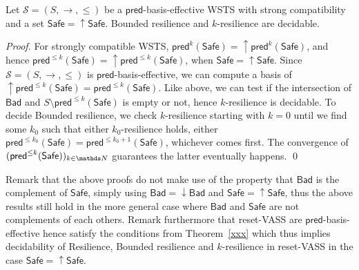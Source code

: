 \documentclass[runningheads]{llncs}
\newcommand{\pred}{\textsf{pred}}
\newcommand{\post}{\textsf{post}}
\newcommand{\Bad}{\textsf{Bad}}
\newcommand{\Safe}{\textsf{Safe}}
\begin{document}
\begin{corollary}
Let $\mathscr{S}=(S,\rightarrow, \leq)$ be a $\pred$-basis-effective WSTS with strong compatibility and a set $\Safe = \mathop{\uparrow} \Safe$.  {\sc Bounded resilience} 
and {\sc $k$-resilience} are decidable.
\end{corollary}

\begin{proof}
For strongly compatible WSTS,
$\pred^{k}(\Safe) = \mathop{\uparrow} \pred^{k}(\Safe)$,
and hence
$\pred^{\leq k}(\Safe) = \mathop{\uparrow} \pred^{\leq k}(\Safe)$,
when $\Safe = \mathop{\uparrow} \Safe$. 
Since $\mathscr{S}=(S,\rightarrow, \leq)$ is $\pred$-basis-effective, we can compute a basis of $\mathop{\uparrow} \pred^{\leq k}(\Safe) = \pred^{\leq k}(\Safe)$.
Like above, we can test if the intersection of $\Bad$
and
$S \setminus \pred^{\leq k}(\Safe)$ is empty or not, hence {\sc $k$-resilience} is decidable.
To decide {\sc Bounded resilience}, we check {\sc $k$-resilience}
starting with $k=0$ until we find some $k_0$ such that either {\sc $k_0$-resilience} holds,
either $\pred^{\leq k_0}(\Safe) = \pred^{\leq k_0+1}(\Safe)$, whichever comes first.
The convergence of $(\pred^{\leq k}(\Safe) )_{k\in\N}$ guarantees the latter eventually happens.
\qed\end{proof}


Remark that the above proofs do not make use of the 
property that $\Bad$ is the complement of $\Safe$, simply using
$\Bad=\mathop{\downarrow} \Bad$ and $\Safe=\mathop{\uparrow} \Safe$, thus 
the above results still hold in the more general case where $\Bad$ and $\Safe$ are not complements of each others.
Remark furthermore that
	reset-VASS are $\pred$-basis-effective
	hence satisfy the conditions from
	Theorem~\ref{xxx}
	which thus implies decidability
	of {\sc Resilience}, {\sc Bounded resilience} 
and {\sc $k$-resilience} in reset-VASS in the case $\Safe = \mathop{\uparrow} \Safe$.


%
%		
\end{document}
